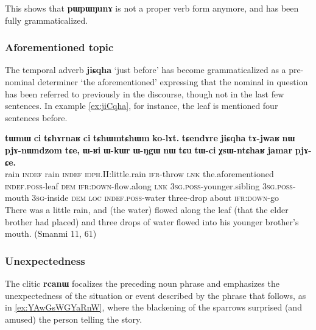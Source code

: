 \documentclass[oldfontcommands,oneside,a4paper,11pt]{article}
\newcommand{\ipa}[1]{\mbox{\phon\textbf{#1}}} %
\begin{document}
This shows that \ipa{pɯpɯŋunɤ} is not a proper verb form anymore, and has been fully grammaticalized.

\subsubsection{Aforementioned topic}
The temporal adverb \ipa{jiɕqha} `just before' has become grammaticalized as a pre-nominal determiner `the aforementioned' expressing that the nominal in question has been referred to previously in the discourse, though not in the last few sentences. In example \ref{ex:jiCqha}, for instance, the leaf is mentioned four sentences before.

\begin{exe}
\ex \label{ex:jiCqha}
 \gll \ipa{tɯmɯ} 	\ipa{ci} 	\ipa{tɕhɤrnaʁ} 	\ipa{ci} 	\ipa{tɕhɯmtɕhɯm} 	\ipa{ko-lɤt.} 	\ipa{tɕendɤre} 	\ipa{jiɕqha} 	\ipa{tɤ-jwaʁ} 	\ipa{nɯ} 	\ipa{pjɤ-nɯndzom} 	\ipa{tɕe,} 	\ipa{ɯ-ʁi} 	\ipa{ɯ-kɯr} 	\ipa{ɯ-ŋgɯ} 	\ipa{nɯ} 	\ipa{tɕu} 	\ipa{tɯ-ci} 	\ipa{χsɯ-ntɕhaʁ} 	\ipa{jamar} 	\ipa{pjɤ-ɕe.} \\
 rain \textsc{indef}  rain \textsc{indef} \textsc{idph}.II:little.rain \textsc{ifr}-throw \textsc{lnk} the.aforementioned \textsc{indef.poss}-leaf \textsc{dem} \textsc{ifr:down}-flow.along \textsc{lnk} \textsc{3sg.poss}-younger.sibling  \textsc{3sg.poss}-mouth \textsc{3sg}-inside \textsc{dem} \textsc{loc} \textsc{indef.poss}-water three-drop about \textsc{ifr:down}-go \\
 \glt There was a little rain, and (the water) flowed along the leaf (that the elder brother had placed) and three drops of water flowed into his younger brother's mouth. (Smanmi 11, 61)
\end{exe}

 \subsubsection{Unexpectedness}
The clitic \ipa{rcanɯ} focalizes the preceding noun phrase and emphasizes the unexpectedness of the situation or event described by the phrase that follows, as in \ref{ex:YAwGsWGYaRnW}, where the blackening of the sparrows surprised (and amused) the person telling the story.

\end{document}
